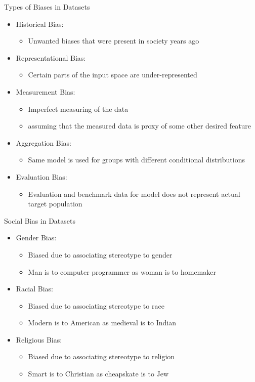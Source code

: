 \documentclass{beamer}
\begin{document}
		\begin{frame}{Types of Biases in Datasets}
			\begin{itemize}
				\item Historical Bias:
				\begin{itemize}
					\item Unwanted biases that were present in society years ago
				\end{itemize}
				\item Representational Bias:
				\begin{itemize}
					\item Certain parts of the input space are under-represented
				\end{itemize}
				\item Measurement Bias:
				\begin{itemize}
					\item Imperfect measuring of the data
					\item assuming that the measured data is proxy of some other desired feature
				\end{itemize}
				\item Aggregation Bias:
				\begin{itemize}
					\item Same model is used for groups with different conditional distributions
				\end{itemize}
				\item Evaluation Bias:
				\begin{itemize}
					\item Evaluation and benchmark data for model does not represent actual target population
				\end{itemize}
			\end{itemize}
			
		\end{frame}
		\begin{frame}{Social Bias in Datasets}
			\begin{itemize}
				\item Gender Bias:
				\begin{itemize}
					\item Biased due to associating stereotype to gender
					\item Man is to computer programmer as woman is to homemaker
				\end{itemize}
				\item Racial Bias:
				\begin{itemize}
					\item Biased due to associating stereotype to race
					\item Modern is to American as medieval is to Indian
				\end{itemize}
				\item Religious Bias:
				\begin{itemize}
					\item Biased due to associating stereotype to religion
					\item Smart is to Christian as cheapskate is to Jew
				\end{itemize}
			\end{itemize}
			
		\end{frame}
\end{document}
